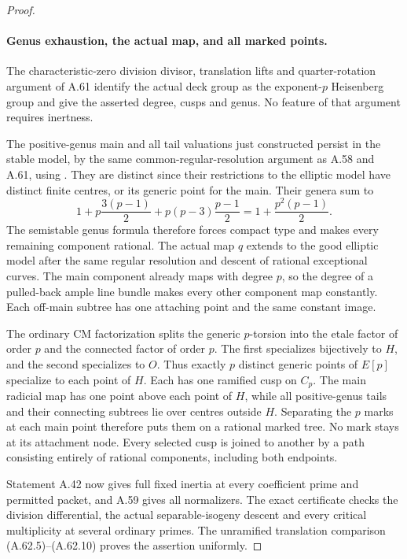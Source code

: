 \begin{proof}
\paragraph{Genus exhaustion, the actual map, and all marked points.}
The characteristic-zero division divisor, translation
lifts and quarter-rotation argument of A.61 identify
the actual deck group as the exponent-\(p\) Heisenberg
group and give the asserted degree, cusps and genus.
No feature of that argument requires inertness.

The positive-genus main and all tail valuations just
constructed persist in the stable model, by the same
common-regular-resolution argument as A.58 and A.61,
using \cite[Theorem 9.2.2, Remark 9.2.6 and
Theorem 9.3.21]{fghLiu}. They are distinct since their
restrictions to the elliptic model have distinct
finite centres, or its generic point for the main.
Their genera sum to
\[
 1+p\frac{3(p-1)}2+p(p-3)\frac{p-1}2
                  =1+\frac{p^2(p-1)}2.                \tag{A.62.17}
\]
The semistable genus formula therefore forces compact
type and makes every remaining component rational.
The actual map \(q\) extends to the good elliptic
model after the same regular resolution and descent
of rational exceptional curves. The main component
already maps with degree \(p\), so the degree of a
pulled-back ample line bundle makes every other
component map constantly. Each off-main subtree
has one attaching point and the same constant image.

The ordinary CM factorization splits the generic
\(p\)-torsion into the etale factor of order \(p\)
and the connected factor of order \(p\). The first
specializes bijectively to \(H\), and the second
specializes to \(O\). Thus exactly \(p\) distinct
generic points of \(E[p]\) specialize to each point
of \(H\). Each has one ramified cusp on \(C_p\).
The main radicial map has one point above each
point of \(H\), while all positive-genus tails
and their connecting subtrees lie over centres
outside \(H\). Separating the \(p\) marks at
each main point therefore puts them on a rational
marked tree. No mark stays at its attachment node.
Every selected cusp is joined to another by a path
consisting entirely of rational components, including
both endpoints.

Statement A.42 now gives full fixed inertia at every
coefficient prime and permitted packet, and A.59
gives all normalizers. The exact certificate
 checks the division differential,
the actual separable-isogeny descent and every
critical multiplicity at several ordinary primes.
The unramified translation comparison
(A.62.5)--(A.62.10) proves the assertion uniformly.
\end{proof}
